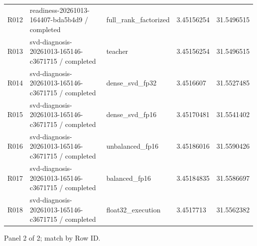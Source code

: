 \documentclass[10pt]{article}
\begin{document}
{\begin{longtable}{p{}p{}p{}p{}p{}}
R012 & readiness-20261013-164407-bda5b4d9 / completed & full\_rank\_factorized & 3.45156254 & 31.5496515 \\
R013 & svd-diagnosis-20261013-165146-c3671715 / completed & teacher & 3.45156254 & 31.5496515 \\
R014 & svd-diagnosis-20261013-165146-c3671715 / completed & dense\_svd\_fp32 & 3.4516607 & 31.5527485 \\
R015 & svd-diagnosis-20261013-165146-c3671715 / completed & dense\_svd\_fp16 & 3.45170481 & 31.5541402 \\
R016 & svd-diagnosis-20261013-165146-c3671715 / completed & unbalanced\_fp16 & 3.45186016 & 31.5590426 \\
R017 & svd-diagnosis-20261013-165146-c3671715 / completed & balanced\_fp16 & 3.45184835 & 31.5586697 \\
R018 & svd-diagnosis-20261013-165146-c3671715 / completed & float32\_execution & 3.4517713 & 31.5562382 \\
\end{longtable}}
\par\noindent Panel 2 of 2; match by Row ID.
\end{document}
